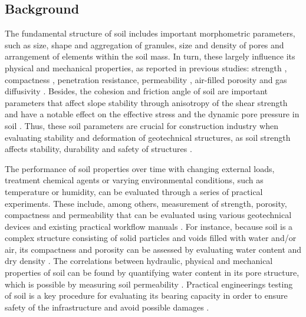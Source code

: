 \documentclass{amestyle}
\begin{document}
\subsection{Background} 
The fundamental structure of soil includes important morphometric parameters, such as size, shape and aggregation of granules, size and density of pores and arrangement of elements within the soil mass. In turn, these largely influence its physical and mechanical properties, as reported in previous studies: strength \cite{5775686}, compactness \cite{5774579,9082607,WANG2022100703}, penetration resistance, permeability \cite{GAO2022100754,CHOONG2022107075}, air-filled porosity \cite{POHL2021115124,ZHANG2021105738,ZIEGLERRIVERA2021103194} and gas diffusivity \cite{Ball}. Besides, the cohesion \cite{Deviren,KIM2021106163} and friction angle of soil \cite{MARZULLI2021813,ZOU20191,KAYA2009252} are important parameters that affect slope stability through anisotropy of the shear strength \cite{WANG20161055,STOCKTON201931} and have a notable effect on the effective stress and the dynamic pore pressure in soil \cite{YE2012111}. Thus, these soil parameters are crucial for construction industry when evaluating stability and deformation of geotechnical structures, as soil strength affects stability, durability and safety of structures \cite{747690,6802685,KULKARNI2022125363,ZHANG2020119293,WANG2022100703}. 

The performance of soil properties over time with changing external loads, treatment chemical agents or varying environmental conditions, such as temperature or humidity, can be evaluated through a series of practical experiments. These include, among others, measurement of strength, porosity, compactness and permeability that can be evaluated using various geotechnical devices and existing practical workflow manuals \cite{Day2001,Davis2008}. For instance, because soil is a complex structure consisting of solid particles and voids filled with water and/or air, its compactness and porosity can be assessed by evaluating water content and dry density \cite{Hillel}. The correlations between hydraulic, physical and mechanical properties of soil can be found by quantifying water content in its pore structure, which is possible by measuring soil permeability \cite{BARBOSA2022115673}. Practical engineerings testing of soil is a key procedure for evaluating its bearing capacity in order to ensure safety of the infrastructure and avoid possible damages \cite{OBIANYO2020120677,BAKAIYANG2021e00626,HAN20181187,KAMAL20212660}. 
\end{document}
